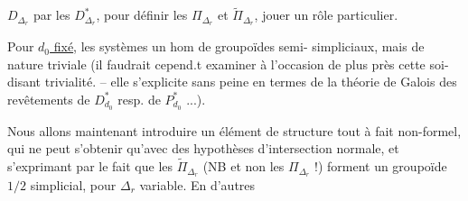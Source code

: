 $D_{\Delta_r}$ par les $D^*_{\Delta_r}$, pour définir les
$\Pi_{\Delta_r}$ et $\widetilde\Pi_{\Delta_r}$, 
jouer un rôle particulier.

Pour \uline{$d_0$ fixé}, les systèmes
 un hom de groupoïdes semi-
simpliciaux, mais de nature 
triviale (il faudrait cepend.t examiner
à l'occasion de plus près cette soi-disant
trivialité. --  elle s'explicite sans peine
en termes de la théorie de Galois
des revêtements de $D^*_{d_0}$ resp. de $P^*_{d_0}$ ...).

Nous allons maintenant introduire
un élément de structure tout à fait
non-formel, qui ne peut s'obtenir
qu'avec des hypothèses 
d'intersection normale, et s'exprimant
par le fait que les $\widetilde\Pi_{\Delta_r}$ (NB et
non les $\Pi_{\Delta_r}$ !) forment un groupoïde
$1/2$ simplicial, pour $\Delta_r$ variable. En d'autres
